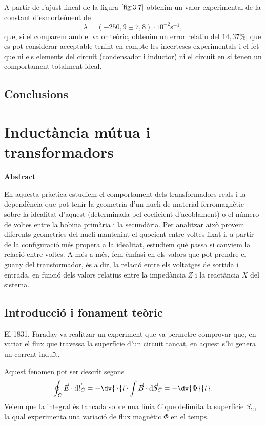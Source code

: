 \documentclass[a4paper,10.5pt]{report}
\newenvironment{chapterabstract}{
	\begin{center}
		\bfseries Abstract
	\end{center}
	\quotation
}{\endquotation}
\begin{document}
A partir de l'ajust lineal de la figura $\ref{fig:3.7}$ obtenim un valor experimental de la constant d'esmorteïment de
\begin{equation*}
	\lambda = (-250,9\pm 7,8)\cdot 10^{-2} \text{s$^{-1}$},
\end{equation*} 
que, si el comparem amb el valor teòric, obtenim un error relatiu del $14{,}37\% $, que es pot considerar acceptable tenint en compte les incerteses experimentals i el fet que ni els elements del circuit (condensador i inductor) ni el circuit en si tenen un comportament totalment ideal. 

\section{Conclusions}


\chapter{Inductància mútua i transformadors}

\begin{chapterabstract}
	En aquesta pràctica estudiem el comportament dels transformadors reals i la dependència que pot tenir la geometria d'un nucli de material ferromagnètic sobre la idealitat d'aquest (determinada pel coeficient d'acoblament) o el número de voltes entre la bobina primària i la secundària. Per analitzar això provem diferents geometries del nucli mantenint el quocient entre voltes fixat i, a partir de la configuració més propera a la idealitat, estudiem què passa si canviem la relació entre voltes. A més a més, fem èmfasi en els valors que pot prendre el guany del transformador, és a dir, la relació entre els voltatges de sortida i entrada, en funció dels valors relatius entre la impedància $Z$ i la reactància $X$ del sistema.
\end{chapterabstract}

\section{Introducció i fonament teòric}
El 1831, Faraday va realitzar un experiment que va permetre comprovar que, en variar el flux que travessa la superfície d'un circuit tancat, en aquest s'hi genera un corrent induït.

Aquest fenomen pot ser descrit segons
\begin{equation}
	\oint_C \Vec{E}\cdot \mathrm{d}\Vec{l}_C = -\dv{}{t} \int \Vec{B}\cdot \mathrm{d} \Vec{S}_C = - \dv{\Phi}{t} \label{eq:4:1}.
\end{equation}
Veiem que la integral és tancada sobre una línia $C$ que delimita la superfície $S_C$, la qual experimenta una variació de flux magnètic $\Phi$ en el temps.
\end{document}
